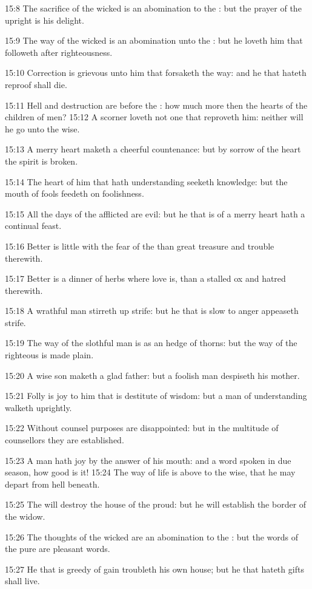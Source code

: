 15:8 The sacrifice of the wicked is an abomination to the \LORD: but the prayer of the upright is his delight.

15:9 The way of the wicked is an abomination unto the \LORD: but he loveth him that followeth after righteousness.

15:10 Correction is grievous unto him that forsaketh the way: and he that hateth reproof shall die.

15:11 Hell and destruction are before the \LORD: how much more then the hearts of the children of men?  15:12 A scorner loveth not one that reproveth him: neither will he go unto the wise.

15:13 A merry heart maketh a cheerful countenance: but by sorrow of the heart the spirit is broken.

15:14 The heart of him that hath understanding seeketh knowledge: but the mouth of fools feedeth on foolishness.

15:15 All the days of the afflicted are evil: but he that is of a merry heart hath a continual feast.

15:16 Better is little with the fear of the \LORD than great treasure and trouble therewith.

15:17 Better is a dinner of herbs where love is, than a stalled ox and hatred therewith.

15:18 A wrathful man stirreth up strife: but he that is slow to anger appeaseth strife.

15:19 The way of the slothful man is as an hedge of thorns: but the way of the righteous is made plain.

15:20 A wise son maketh a glad father: but a foolish man despiseth his mother.

15:21 Folly is joy to him that is destitute of wisdom: but a man of understanding walketh uprightly.

15:22 Without counsel purposes are disappointed: but in the multitude of counsellors they are established.

15:23 A man hath joy by the answer of his mouth: and a word spoken in due season, how good is it!  15:24 The way of life is above to the wise, that he may depart from hell beneath.

15:25 The \LORD will destroy the house of the proud: but he will establish the border of the widow.

15:26 The thoughts of the wicked are an abomination to the \LORD: but the words of the pure are pleasant words.

15:27 He that is greedy of gain troubleth his own house; but he that hateth gifts shall live.

